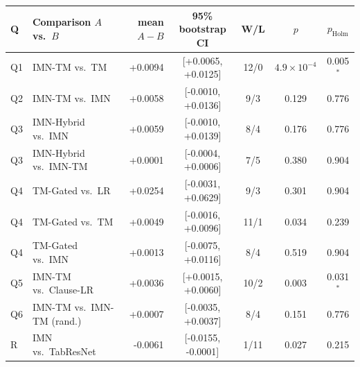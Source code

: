 \begin{tabular}{llrcccc}
\toprule
Q & Comparison $A$ vs.\ $B$ & mean $A{-}B$ & 95\% bootstrap CI & W/L & $p$ & $p_\text{Holm}$ \\
\midrule
Q1 & IMN-TM vs.\ TM & +0.0094 & [+0.0065, +0.0125] & 12/0 & \ensuremath{4.9\times 10^{-4}} & 0.005$^\ast$ \\
Q2 & IMN-TM vs.\ IMN & +0.0058 & [-0.0010, +0.0136] & 9/3 & 0.129 & 0.776 \\
Q3 & IMN-Hybrid vs.\ IMN & +0.0059 & [-0.0010, +0.0139] & 8/4 & 0.176 & 0.776 \\
Q3 & IMN-Hybrid vs.\ IMN-TM & +0.0001 & [-0.0004, +0.0006] & 7/5 & 0.380 & 0.904 \\
Q4 & TM-Gated vs.\ LR & +0.0254 & [-0.0031, +0.0629] & 9/3 & 0.301 & 0.904 \\
Q4 & TM-Gated vs.\ TM & +0.0049 & [-0.0016, +0.0096] & 11/1 & 0.034 & 0.239 \\
Q4 & TM-Gated vs.\ IMN & +0.0013 & [-0.0075, +0.0116] & 8/4 & 0.519 & 0.904 \\
Q5 & IMN-TM vs.\ Clause-LR & +0.0036 & [+0.0015, +0.0060] & 10/2 & 0.003 & 0.031$^\ast$ \\
Q6 & IMN-TM vs.\ IMN-TM (rand.) & +0.0007 & [-0.0035, +0.0037] & 8/4 & 0.151 & 0.776 \\
R & IMN vs.\ TabResNet & -0.0061 & [-0.0155, -0.0001] & 1/11 & 0.027 & 0.215 \\
\bottomrule
\end{tabular}
